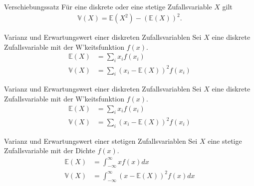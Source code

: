\documentclass[t,11pt]{beamer}
\begin{document}
	\subtitle{}
	\logo{}
	\institute{}
	\date{}
	\subject{}

\addtocounter{framenumber}{-1}

\begin{frame}
\begin{alertblock}{Verschiebungssatz}
	Für eine diskrete oder eine stetige Zufallsvariable $X$ gilt
	\begin{align*}
	\mathbb{V}(X) =  \mathbb{E}(X^2)-\left( \mathbb{E}(X) \right)^2.
	\end{align*}
\end{alertblock}
\end{frame}

\begin{frame}
\begin{exampleblock}{Varianz und Erwartungswert einer diskreten Zufallsvariablen}
	Sei $X$ eine diskrete Zufallsvariable mit der W'keitsfunktion $f(x)$.
	\begin{align*}
	\mathbb{E}(X) &= \sum_i x_i f(x_i) \\
	\mathbb{V}(X) &= \sum_i \left(x_i-\mathbb{E}(X)\right)^2 f(x_i)
	\end{align*}
\end{exampleblock}
\end{frame}

\begin{frame}
	\begin{exampleblock}{Varianz und Erwartungswert einer diskreten Zufallsvariablen}
		Sei $X$ eine diskrete Zufallsvariable mit der W'keitsfunktion $f(x)$.
		\begin{align*}
		\mathbb{E}(X) &= \sum_i x_i f(x_i) \\
		\mathbb{V}(X) &= \sum_i \left(x_i-\mathbb{E}(X)\right)^2 f(x_i)
		\end{align*}
	\end{exampleblock}
	\begin{exampleblock}{Varianz und Erwartungswert einer stetigen Zufallsvariablen}
		Sei $X$ eine stetige Zufallsvariable mit der Dichte $f(x)$.
		\begin{align*}
		\mathbb{E}(X) &= \int_{-\infty}^{\infty} xf(x)dx \\
		\mathbb{V}(X) &= \int_{-\infty}^{\infty} \left( x-\mathbb{E}(X) \right)^2 f(x)dx
		\end{align*}
	\end{exampleblock}
\end{frame}
\end{document}
